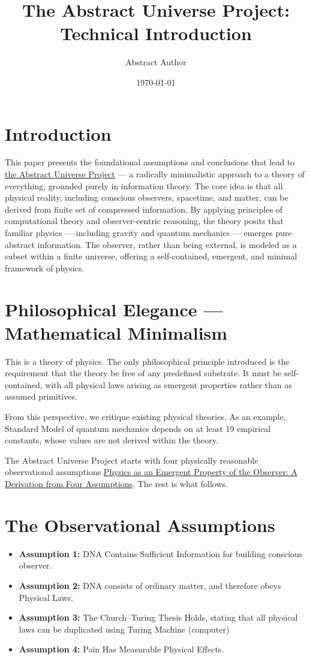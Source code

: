 \documentclass[11pt]{article}
\title{The Abstract Universe Project: Technical Introduction}
\author{Abstract Author}
\date{\today}
\begin{document}
\maketitle

\section{Introduction}

This paper presents the foundational assumptions and conclusions that lead to \href{run:./paper2.pdf}{the Abstract Universe Project}  — a radically minimalistic approach to a theory of everything, grounded purely in information theory. The core idea is that all physical reality, including conscious observers, spacetime, and matter, can be derived from finite set of compressed information. By applying principles of computational theory and observer-centric reasoning, the theory posits that familiar physics — including gravity and quantum mechanics — emerges pure abstract information. The observer, rather than being external, is modeled as a subset within a finite universe, offering a self-contained, emergent, and minimal framework of physics.


\section{Philosophical Elegance — Mathematical Minimalism}

This is a theory of physics. The only philosophical principle introduced is the requirement that the theory be free of any predefined substrate. It must be self-contained, with all physical laws arising as emergent properties rather than as assumed primitives.

From this perspective, we critique existing physical theories. As an example, Standard Model of quantum mechanics depends on at least 19 empirical constants, whose values are not derived within the theory.

The Abstract Universe Project starts with four physically reasonable observational assumptions \href{run:./paper2.pdf}{Physics as an Emergent Property of the Observer: A Derivation from Four Assumptions}. The rest is what follows.



\section{The Observational Assumptions}

\begin{itemize}
      \item \textbf{Assumption 1:} DNA Contains Sufficient Information for building conscious observer.
      \item \textbf{Assumption 2:} DNA consists of ordinary matter, and therefore obeys Physical Laws.
      \item \textbf{Assumption 3:} The Church–Turing Thesis Holds, stating that all physical laws can be duplicated using Turing Machine (computer)
      \item \textbf{Assumption 4:} Pain Has Measurable Physical Effects.
\end{itemize}
\end{document}
